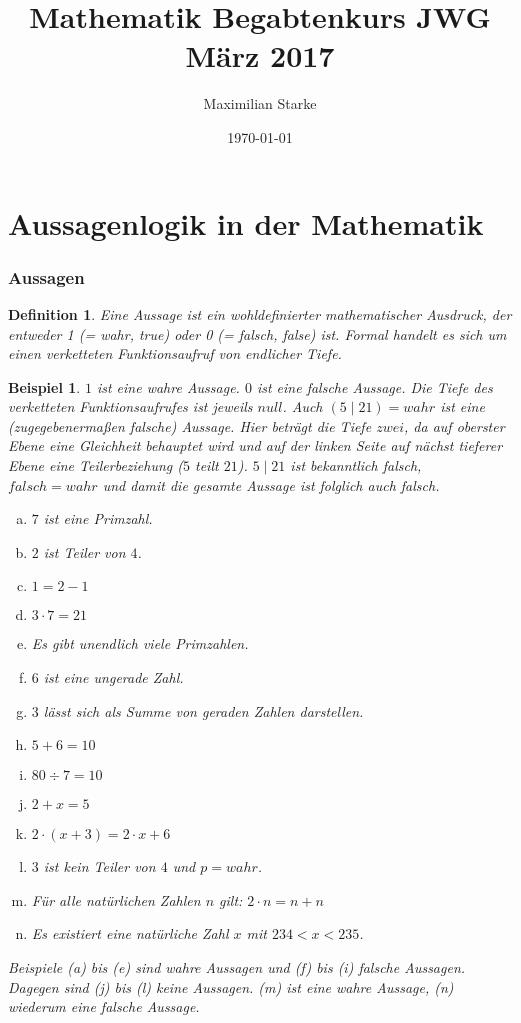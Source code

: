\documentclass[a4paper]{article}
\title{Mathematik Begabtenkurs JWG März 2017}
\author{Maximilian Starke}
\date{\today}
\newtheorem{beispiel}[satz]{Beispiel}
\newtheorem{definition}[satz]{Definition} %
\theoremstyle{nonumberplain}
\begin{document}
\maketitle


\part{Aussagenlogik in der Mathematik}

\section{Aussagen}

\begin{definition}\label{d:aussage}
Eine Aussage ist ein wohldefinierter mathematischer Ausdruck, der entweder 1 (= wahr, true) oder 0 (= falsch, false) ist. Formal handelt es sich um einen verketteten Funktionsaufruf von endlicher Tiefe. 
\end{definition}

\begin{beispiel}
	$1$ ist eine wahre Aussage. $0$ ist eine falsche Aussage. Die Tiefe des verketteten Funktionsaufrufes ist jeweils $null$. Auch $(5\mid21) = wahr$ ist eine (zugegebenermaßen \textit{falsche}) Aussage. Hier beträgt die Tiefe $zwei$, da auf oberster Ebene eine Gleichheit behauptet wird und auf der linken Seite auf nächst tieferer Ebene eine Teilerbeziehung ($5$ teilt $21$). $5\mid21$ ist bekanntlich falsch, $falsch=wahr$ und damit die gesamte Aussage ist folglich auch falsch.
	
	\begin{multicols}{2}
		\begin{enumerate}[(a)]
			\item $7$ ist eine Primzahl.
			\item $2$ ist Teiler von $4$.
			\item $1=2-1$
			\item $3\cdot7=21$
			\item Es gibt unendlich viele Primzahlen.
			\item $6$ ist eine ungerade Zahl.
			\item $3$ lässt sich als Summe von geraden Zahlen darstellen.
			\item $5+6=10$
			\item $80\div7=10$
			\item $2+x=5$
			\item $2\cdot(x+3)=2\cdot x+6$
			\item $3$ ist kein Teiler von $4$ und $p=wahr$.
			\item Für alle natürlichen Zahlen $n$ gilt: $2\cdot n = n+n$
			\item Es existiert eine natürliche Zahl $x$ mit ${234<x<235}$.
		\end{enumerate}
	\end{multicols}

Beispiele (a) bis (e) sind wahre Aussagen und (f) bis (i) falsche Aussagen. Dagegen sind (j) bis (l) keine Aussagen. (m) ist eine wahre Aussage, (n) wiederum eine falsche Aussage.
\end{beispiel}
\end{document}
